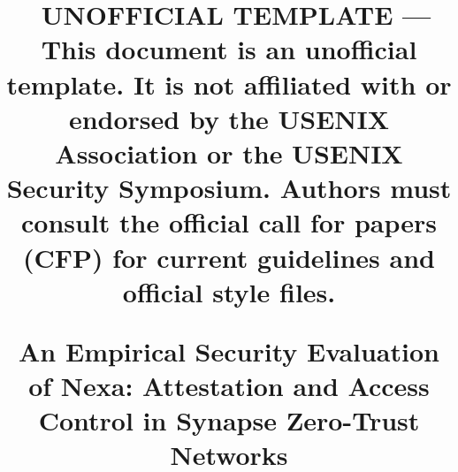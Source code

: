 \usepackage{amsmath}
\usepackage{amssymb}
\usepackage{booktabs}
\usepackage{mathptmx}
\usepackage[table]{xcolor}
\usepackage{tcolorbox}
\usepackage{tikz}
\usepackage{titlesec}
\usepackage{enumitem}
\usepackage{fontawesome5}
\usepackage[hyphens]{url}
\usepackage{hyperref}

\usepackage[
  letterpaper,
  text={7in,9in},
  top=1.0in,
  left=0.75in,
  columnsep=0.25in
]{geometry}

\setlength{\parindent}{1em}
\setlength{\parskip}{0pt}
\pagestyle{plain}


\titleformat{\section}{\large\bfseries\color{secblue}}{\thesection}{1em}{}
\titleformat{\subsection}{\normalsize\bfseries\color{secblue}}{\thesubsection}{1em}{}
\titleformat{\subsubsection}{\normalsize\itshape}{\thesubsubsection}{1em}{}


\usetikzlibrary{positioning,calc}



\title{
  \vspace{-1.5cm}
  \begin{tcolorbox}[
    colback=warnbg,
    colframe=warnborder,
    arc=3pt,
    outer arc=3pt,
    width=\textwidth,
    boxrule=0.8pt,
    top=6pt,
    bottom=6pt,
    left=10pt,
    right=10pt,
    halign=center
  ]
    \small\sffamily\color{warnborder!80!black}
    \textbf{\faExclamationTriangle~UNOFFICIAL TEMPLATE} --- This document is an unofficial template. It is not affiliated with or endorsed by the USENIX Association or the USENIX Security Symposium. Authors must consult the official call for papers (CFP) for current guidelines and official style files.
  \end{tcolorbox}
  \vspace{1.5em}
  An Empirical Security Evaluation of Nexa: Attestation and Access Control in Synapse Zero-Trust Networks
}

